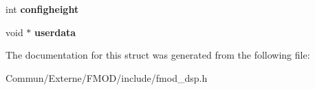 \begin{DoxyCompactItemize}
\item 
int {\bfseries configheight}\hypertarget{struct_f_m_o_d___d_s_p___d_e_s_c_r_i_p_t_i_o_n_a896589017397442724a4e26a6aa2d921}{}\label{struct_f_m_o_d___d_s_p___d_e_s_c_r_i_p_t_i_o_n_a896589017397442724a4e26a6aa2d921}

\item 
void $\ast$ {\bfseries userdata}\hypertarget{struct_f_m_o_d___d_s_p___d_e_s_c_r_i_p_t_i_o_n_a1610f0c65c07582271120060e36e9d87}{}\label{struct_f_m_o_d___d_s_p___d_e_s_c_r_i_p_t_i_o_n_a1610f0c65c07582271120060e36e9d87}

\end{DoxyCompactItemize}


The documentation for this struct was generated from the following file\+:\begin{DoxyCompactItemize}
\item 
Commun/\+Externe/\+F\+M\+O\+D/include/fmod\+\_\+dsp.\+h\end{DoxyCompactItemize}
